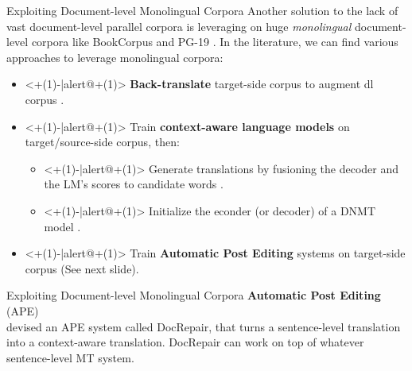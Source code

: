 \begin{frame}{Exploiting Document-level Monolingual Corpora}
	Another solution to the lack of vast document-level parallel corpora is leveraging on huge \textit{monolingual} document-level corpora like BookCorpus \cite{zhu_aligning_2015} and PG-19 \cite{rae_compressive_2019}. In the literature, we can find various approaches to leverage monolingual corpora:
	\begin{itemize}
		\item<+(1)-|alert@+(1)> \textbf{Back-translate} target-side corpus to augment dl corpus \cite{sugiyama_data_2019}.
		\item<+(1)-|alert@+(1)> Train \textbf{context-aware language models} on target/source-side corpus, then:
		\begin{itemize}
			\item<+(1)-|alert@+(1)> Generate translations by fusioning the decoder and the LM's scores to candidate words  \cite{martinez_garcia_context-aware_2019}.
			\item<+(1)-|alert@+(1)> Initialize the econder (or decoder) of a DNMT model \cite{li_pretrained_2019}.
		\end{itemize}  
		\item<+(1)-|alert@+(1)> Train \textbf{Automatic Post Editing} systems on target-side corpus (See next slide).
	\end{itemize}
\end{frame}

\begin{frame}{Exploiting Document-level Monolingual Corpora}
	\textbf{Automatic Post Editing} (APE)\\
	\cite{voita_context-aware_2019} devised an APE system called DocRepair, that turns a sentence-level translation into a context-aware translation. DocRepair can work on top of whatever sentence-level MT system.
\end{frame}

